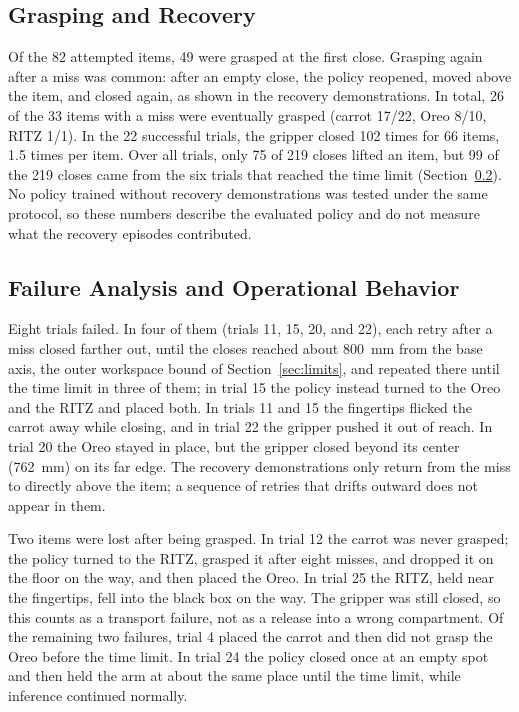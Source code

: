 \subsection{Grasping and Recovery}
\label{sec:grasping}
Of the 82 attempted items, 49 were grasped at the first close. Grasping
again after a miss was common: after an empty close, the policy reopened,
moved above the item, and closed again, as shown in the recovery
demonstrations. In total, 26 of the 33 items with a miss were eventually
grasped (carrot 17/22, Oreo 8/10, RITZ 1/1). In the 22 successful trials, the
gripper closed 102 times for 66 items, 1.5 times per item. Over all trials,
only 75 of 219 closes lifted an item, but 99 of the 219 closes came from the
six trials that reached the time limit (Section~\ref{sec:failures}). No policy
trained without recovery demonstrations was tested under the same protocol, so
these numbers describe the evaluated policy and do not measure what the
recovery episodes contributed.

\subsection{Failure Analysis and Operational Behavior}
\label{sec:failures}
Eight trials failed. In four of them (trials 11, 15, 20, and 22), each retry
after a miss closed farther out, until the closes reached about 800~mm from
the base axis, the outer workspace bound of Section~\ref{sec:limits}, and
repeated there until the time limit in three of them; in trial 15 the policy
instead turned to the Oreo and the RITZ and placed both. In trials 11 and 15 the fingertips
flicked the carrot away while closing, and in trial 22 the gripper pushed it
out of reach. In trial 20 the Oreo stayed in place, but the gripper closed
beyond its center (762~mm) on its far edge. The recovery demonstrations only
return from the miss to directly above the item; a sequence of retries that
drifts outward does not appear in them.

Two items were lost after being grasped. In trial 12 the carrot was never
grasped; the policy turned to the RITZ, grasped it after eight misses, and
dropped it on the floor on the way, and then placed the Oreo. In trial 25 the
RITZ, held near the fingertips, fell into the black box on the way. The
gripper was still closed, so this counts as a transport failure, not as a
release into a wrong compartment. Of the remaining two failures, trial 4
placed the carrot and then did not grasp the Oreo before the time limit. In
trial 24 the policy closed once at an empty spot and then held the arm at
about the same place until the time limit, while inference continued
normally.


